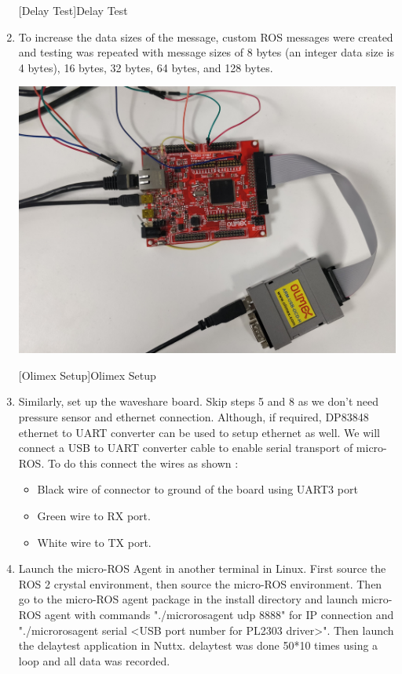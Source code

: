 \documentclass[%
xelatex,
	oneside,		%
	12pt,			%
	parskip=half,	%
	abstracton,
	chapterprefix=true%
    appendixprefix=true]
{scrbook}
\begin{document}
\begin{enumerate}
\begin{center}
[Delay Test]{Delay Test}
\label{fig:delay}
\end{center}
\item To increase the data sizes of the message, custom ROS messages were created and testing was repeated with message sizes of 8 bytes (an integer data size is 4 bytes), 16 bytes, 32 bytes, 64 bytes, and 128 bytes.
\begin{center}
\includegraphics[scale=0.1]{fig/olimex.jpg}

[Olimex Setup]{Olimex Setup}
\label{fig:olimexsetup}
\end{center}
\item Similarly, set up the waveshare board. Skip steps 5 and 8 as we don't need pressure sensor and ethernet connection. Although, if required, DP83848 ethernet to UART converter can be used to setup ethernet as well. We will connect a USB to UART converter cable to enable serial transport of micro-ROS. To do this connect the wires as shown : 
\begin{itemize}
\item Black wire of connector to ground of the board using UART3 port
\item Green wire to RX port.
\item White wire to TX port.
\end{itemize}
\item Launch the micro-ROS Agent in another terminal in Linux. First source the ROS 2 crystal environment, then source the micro-ROS environment. Then go to the micro-ROS agent package in the install directory and launch micro-ROS agent with commands "./micro\textunderscore ros\textunderscore agent udp 8888" for IP connection and "./micro\textunderscore ros\textunderscore agent serial <USB port number for PL2303 driver>". Then launch the delay\textunderscore test application in Nuttx. delay\textunderscore test was done 50*10 times using a loop and all data was recorded.
\end{enumerate}
\end{document}
